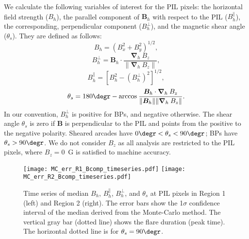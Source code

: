 \documentclass[times,twocolumn]{aastex631}
\begin{document}
\begin{CJK*}{UTF8}{gbsn}
We calculate the following variables of interest for the PIL pixels: the horizontal field strength ($B_h$), the parallel component of $\bm{B}_h$ with respect to the PIL ($B_{h}^{\parallel}$), the corresponding, perpendicular component ($B_{h}^{\perp}$), and the magnetic shear angle ($\theta_s$). They are defined as follows:
\begin{equation}
B_{h} = \left( B_x^2+ B_y^2 \right)^{1/2},
\label{eqn:bh}
\end{equation}
\begin{equation}
B_{h}^{\perp} = \bm{B}_{h} \cdot \dfrac{\bm{\nabla}_{h} \: B_{z}}{\lVert \bm{\nabla}_{h} \: B_{z} \rVert},
\label{eqn:bh_perp}
\end{equation}
\begin{equation}
B_{h}^{\parallel} = \left[ B_{h}^{2} - \left( B_{h}^{\perp} \right) ^2 \right]^{1/2},
\label{eqn:bp_para}
\end{equation}
\begin{equation}
\theta_s  = 180\degr -  \mathrm{arccos} \: \dfrac{\bm{B}_{h} \cdot \bm{\nabla}_{h} \: B_{z}}{\lVert \bm{B}_{h} \rVert \lVert \bm{\nabla}_{h} \: B_{z} \rVert}.
\label{eqn:thetas}
\end{equation}
In our convention, $B_h^\perp$ is positive for BPs, and negative otherwise. The shear angle $\theta_s$ is zero if $\bm{B}$ is perpendicular to the PIL and points from the positive to the negative polarity. Sheared arcades have $0\degr<\theta_s<90\degr$; BPs have $\theta_s > 90\degr$. We do not consider $B_z$ as all analysis are restricted to the PIL pixels, where $B_z=0$~G is satisfied to machine accuracy.


\begin{figure*}[t!]
\centering
\texttt{[image: MC\_err\_R1\_Bcomp\_timeseries.pdf]}
\hspace{2mm}
\texttt{[image: MC\_err\_R2\_Bcomp\_timeseries.pdf]}
\caption{Time series of median $B_h$, $B_h^\parallel$, $B_h^\perp$, and $\theta_s$ at PIL pixels in Region 1 (left) and Region 2 (right). The error bars show the 1$\sigma$ confidence interval of the median derived from the Monte-Carlo method. The vertical gray bar (dotted line) shows the flare duration (peak time). The horizontal dotted line is for $\theta_s=90\degr$.}
\label{fig:Bts}
\end{figure*}


\end{CJK*}
\end{document}
